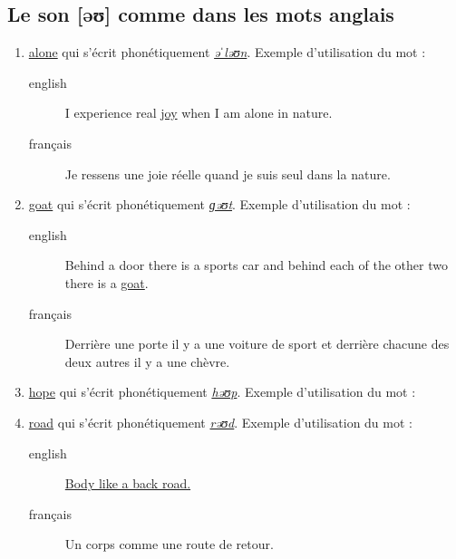 \subsection{Le son [əʊ] comme dans les mots anglais}
\label{sec:org7325c5a}
\begin{enumerate}
\item \href{http://www.wordreference.com/enfr/alone}{alone} qui s'écrit phonétiquement \href{https://en.oxforddictionaries.com/definition/alone}{\emph{əˈləʊn}}. Exemple d'utilisation du mot :
\begin{description}
\item[{english}] \textenglish{I experience real \href{https://youtu.be/cnsk7iXFCtY}{joy} when I am alone in nature.}
\item[{français}] Je ressens une joie réelle quand je suis seul dans la
nature.
\end{description}
\item \href{http://www.wordreference.com/enfr/goat}{goat} qui s'écrit phonétiquement \href{https://en.oxforddictionaries.com/definition/goat}{\emph{ɡəʊt}}. Exemple d'utilisation du mot :
\begin{description}
\item[{english}] \textenglish{Behind a door there is a sports car and behind each of
the other two there is a \href{https://youtu.be/pEHWbpy-EpI}{goat}.}
\item[{français}] Derrière une porte il y a une voiture de sport et
derrière chacune des deux autres il y a une chèvre.
\end{description}
\item \href{http://www.wordreference.com/enfr/hope}{hope} qui s'écrit phonétiquement \href{https://en.oxforddictionaries.com/definition/hope}{\emph{həʊp}}. Exemple d'utilisation du mot :
\item \href{http://www.wordreference.com/enfr/road}{road} qui s'écrit phonétiquement \href{https://en.oxforddictionaries.com/definition/road}{\emph{rəʊd}}. Exemple d'utilisation du mot :
\begin{description}
\item[{english}] \textenglish{\href{https://youtu.be/jzmy6iUGDo8}{Body like a back road.}}
\item[{français}] Un corps comme une route de retour.
\end{description}
\end{enumerate}
